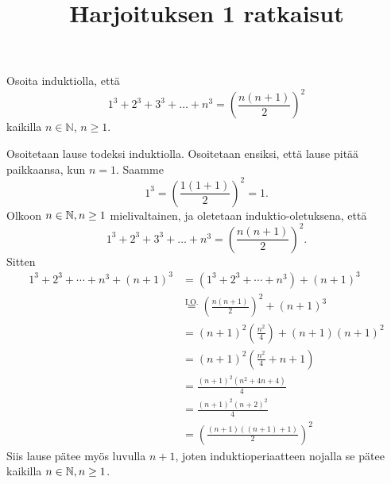 \documentclass[12pt,a4paper]{article}
\title{Harjoituksen 1 ratkaisut}
\date{}
\author{}
\begin{document}
\maketitle

\noindent

\begin{exercise}
  Osoita induktiolla, että
  \[
    1^3 + 2^3 + 3^3 + \dots + n^3 =\left(\frac{n(n + 1)}{2}\right)^2
  \]
  kaikilla \(n \in \mathbb{N}\), \(n \geq 1\).
\end{exercise}

\begin{solution}
  Osoitetaan lause todeksi induktiolla. Osoitetaan ensiksi, että lause
  pitää paikkaansa, kun \(n = 1\). Saamme
  \[
    1^3 = \left(\frac{1(1 + 1)}{2}\right)^2 = 1.
  \]
  Olkoon \(n \in \mathbb{N}, n \geq 1\) mielivaltainen, ja oletetaan
  induktio-oletuksena, että
  \[
    1^3 + 2^3 + 3^3 + \dots + n^3 =\left(\frac{n(n + 1)}{2}\right)^2.
  \] Sitten
  \begin{align*}
    1^3 + 2^3 + \cdots + n^3 + (n + 1)^3
    &= (1^3 + 2^3 + \cdots + n^3) + (n + 1)^3 \\
    &\overset{\text{I.O.}}{=} \left(\frac{n(n + 1)}{2}\right)^2
    + (n + 1)^3 \\
    &= (n + 1)^2\left(\frac{n^2}{4}\right) + (n + 1)(n + 1)^2 \\
    &= (n + 1)^2\left(\frac{n^2}{4} + n + 1\right) \\
    &= \frac{(n + 1)^2(n^2 + 4n + 4)}{4} \\
    &= \frac{(n + 1)^2(n + 2)^2}{4} \\
    &= \left(\frac{(n + 1)((n + 1) + 1)}{2}\right)^2
  \end{align*}
  Siis lause pätee myös luvulla \(n + 1\), joten induktioperiaatteen nojalla
  se pätee kaikilla \(n \in \mathbb{N}, n \geq 1\).
\end{solution}
\end{document}
